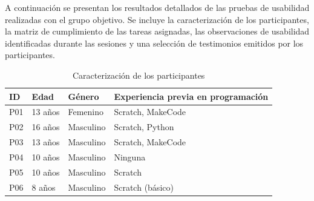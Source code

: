 \label{apx:pruebas-usabilidad}

A continuación se presentan los resultados detallados de las pruebas de usabilidad realizadas con el grupo objetivo. Se incluye la caracterización de los participantes, la matriz de cumplimiento de las tareas asignadas, las observaciones de usabilidad identificadas durante las sesiones y una selección de testimonios emitidos por los participantes.

\begin{table}[H]
    \caption{Caracterización de los participantes}
    \label{tab:caracterizacion-participantes}
    \begin{tabularx}{\textwidth}{ l l l X }
        \hline
        \textbf{ID} & \textbf{Edad} & \textbf{Género} & \textbf{Experiencia previa en programación} \\
        \hline
        P01         & 13 años       & Femenino        & Scratch, MakeCode                           \\
        P02         & 16 años       & Masculino       & Scratch, Python                             \\
        P03         & 13 años       & Masculino       & Scratch, MakeCode                           \\
        P04         & 10 años       & Masculino       & Ninguna                                     \\
        P05         & 10 años       & Masculino       & Scratch                                     \\
        P06         & 8 años        & Masculino       & Scratch (básico)                            \\
        \hline
    \end{tabularx}
\end{table}

